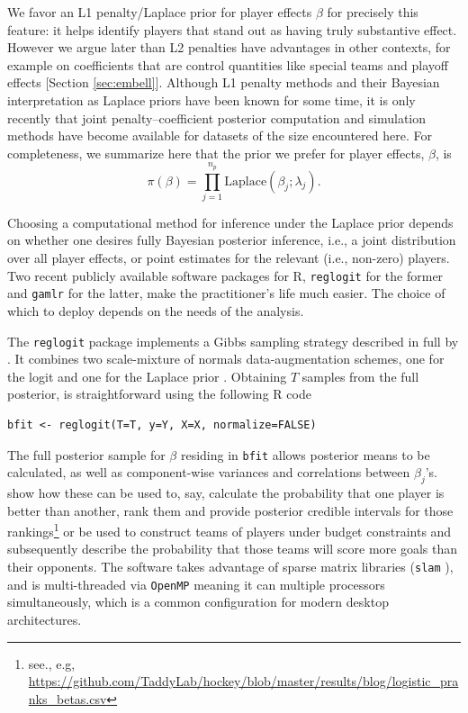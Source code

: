 We favor an L1 penalty/Laplace prior for player effects $\beta$ for precisely
this feature: it helps identify players that stand out as having truly
substantive effect.  However we argue later than L2 penalties have advantages
in other contexts, for example on coefficients that are control quantities
like special teams and playoff effects [Section \ref{sec:embell}]. Although L1
penalty methods and their Bayesian interpretation as Laplace priors have been
known for some time, it is only recently that joint penalty--coefficient
posterior computation and simulation methods have become available for
datasets of the size encountered here.  For completeness, we summarize here
that the prior we prefer for player effects, $\beta$, is
\begin{equation}
\pi(\beta) = \prod_{j=1}^{n_p} \mathrm{Laplace}(\beta_j; \lambda_j).
\end{equation}

Choosing a computational method for inference under the Laplace prior depends
on whether one desires fully Bayesian posterior inference, i.e., a joint
distribution over all player effects, or point estimates for the relevant
(i.e., non-zero) players.  Two recent publicly available software packages
for {\sf R}, {\tt reglogit} \cite{reglogit} for the former and {\tt gamlr}
\cite{gamlr} for the latter, make the practitioner's life much easier. The
choice of which to deploy depends on the needs of the analysis. 

The {\tt reglogit} package implements a Gibbs sampling strategy
\cite{gem:gem:1984} described in full by \cite{gra:pols:2012}.  It combines
two scale-mixture of normals data-augmentation schemes, one for the logit
\cite{holmes:held:2006} and one for the Laplace prior \cite{park:casella:2008}.
Obtaining $T$ samples from the full posterior, is straightforward using the
following {\sf R} code
\begin{verbatim}
bfit <- reglogit(T=T, y=Y, X=X, normalize=FALSE)
\end{verbatim}
The full posterior sample for $\beta$ residing in {\tt bfit} allows posterior
means to be calculated, as well as component-wise variances and correlations
between $\beta_j$'s.  \cite{gramacy:jensen:taddy:2013} show how these can be
used to, say, calculate the probability that one player is better than
another, rank them and provide posterior credible intervals for those
rankings\footnote{see., e.g, 
\url{https://github.com/TaddyLab/hockey/blob/master/results/blog/logistic_pranks_betas.csv}
} or be used to construct teams of players under budget constraints and
subsequently describe the probability that those teams will score more goals
than their opponents.  The software takes advantage of sparse matrix libraries
({\tt slam} \cite{slam}), and is multi-threaded via {\tt OpenMP} meaning it 
can multiple processors simultaneously, which is a common
configuration for modern desktop architectures.


